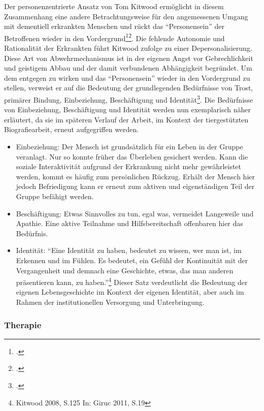 Der personenzentrierte Ansatz von Tom Kitwood ermöglicht in diesem Zusammenhang eine andere Betrachtungsweise für den angemessenen Umgang mit dementiell erkrankten Menschen und rückt das "`Personensein"' der Betroffenen wieder in den Vordergrund\footcite[vgl.][17f]{Giruc2011}\footcite[vgl.][67f]{o.A.2013}. Die fehlende Autonomie und Rationalität der Erkrankten führt Kitwood zufolge zu einer Depersonalisierung. Diese Art von  Abwehrmechanismus ist in der eigenen Angst vor Gebrechlichkeit und geistigem Abbau und der damit verbundenen Abhängigkeit begründet. Um dem entgegen zu wirken und das "`Personensein"' wieder in den Vordergrund zu stellen, verweist er auf die Bedeutung der grundlegenden Bedürfnisse von Trost, primärer Bindung, Einbeziehung, Beschäftigung und Identität\footcite[vgl.][18f]{Giruc2011}. Die Bedürfnisse von Einbeziehung, Beschäftigung und Identität werden nun exemplarisch näher erläutert, da sie im späteren Verlauf der Arbeit, im Kontext der tiergestützten Biografiearbeit, erneut aufgegriffen werden.

\begin{itemize}
\item Einbeziehung: Der Mensch ist grundsätzlich für ein Leben in der Gruppe veranlagt. Nur so konnte früher das Überleben gesichert werden. Kann die soziale Interaktivität aufgrund der Erkrankung nicht mehr gewährleistet werden, kommt es häufig zum persönlichen Rückzug. Erhält der Mensch hier jedoch Befriedigung kann er erneut zum aktiven und eigenständigen Teil der Gruppe befähigt werden.
\item Beschäftigung: Etwas Sinnvolles zu tun, egal was, vermeidet Langeweile und Apathie. Eine aktive Teilnahme und Hilfsbereitschaft offenbaren hier das Bedürfnis.
\item Identität: "`Eine Identität zu haben, bedeutet zu wissen, wer man ist, im Erkennen und im Fühlen. Es bedeutet, ein Gefühl der Kontinuität mit der Vergangenheit und demnach eine Geschichte, etwas, das man anderen präsentieren kann, zu haben."'\footnote{Kitwood 2008, S.125 In: Giruc 2011, S.19} Dieser Satz verdeutlicht die Bedeutung der eigenen Lebensgeschichte im Kontext der eigenen Identität, aber auch im Rahmen der institutionellen Versorgung und Unterbringung.
\end{itemize}

\subsubsection{Therapie}
\label{sec:k2.2.4_Therapie}

